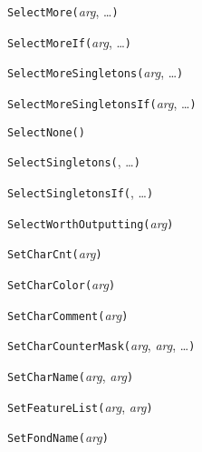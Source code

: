 
\noindent\texttt{SelectMore(}\textit{arg}, \ldots\texttt{)}


\noindent\texttt{SelectMoreIf(}\textit{arg}, \ldots\texttt{)}


\noindent\texttt{SelectMoreSingletons(}\textit{arg}, \ldots\texttt{)}


\noindent\texttt{SelectMoreSingletonsIf(}\textit{arg}, \ldots\texttt{)}


\noindent\texttt{SelectNone(}\texttt{)}


\noindent\texttt{SelectSingletons(}, \ldots\texttt{)}


\noindent\texttt{SelectSingletonsIf(}, \ldots\texttt{)}


\noindent\texttt{SelectWorthOutputting(}\textit{arg}\texttt{)}


\noindent\texttt{SetCharCnt(}\textit{arg}\texttt{)}


\noindent\texttt{SetCharColor(}\textit{arg}\texttt{)}


\noindent\texttt{SetCharComment(}\textit{arg}\texttt{)}


\noindent\texttt{SetCharCounterMask(}\textit{arg}, \textit{arg}, \ldots\texttt{)}


\noindent\texttt{SetCharName(}\textit{arg}, \textit{arg}\texttt{)}


\noindent\texttt{SetFeatureList(}\textit{arg}, \textit{arg}\texttt{)}


\noindent\texttt{SetFondName(}\textit{arg}\texttt{)}


